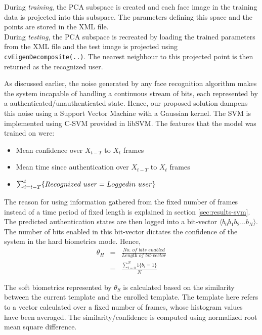 \documentclass[%
        final,
        notitlepage,
        narroweqnarray,
        inline,
        ]{ieee}
\begin{document}
During \emph{training}, the PCA subspace is created and each face image in the training data is projected into this subspace.
The parameters defining this space and the points are stored in the XML file.\\
During \emph{testing}, the PCA subspace is recreated by loading the trained parameters from the XML file and the test image is projected using \verb+cvEigenDecomposite(..)+.
The nearest neighbour to this projected point is then returned as the recognized user.

As discussed earlier, the noise generated by any face recognition algorithm makes the system incapable of handling a continuous stream of bits, each represented by a authenticated/unauthenticated state.
Hence, our proposed solution dampens this noise using a Support Vector Machine with a Gaussian kernel.
The SVM is implemented using C-SVM provided in libSVM\cite{libsvm}.
The features that the model was trained on were:
\begin{itemize}
	\item Mean confidence over $X_{t-T}$ to $X_{t}$ frames
	\item Mean time since authentication over $X_{t-T}$ to $X_{t}$ frames
	\item $\sum_{i=t-T}^{t}\{Recognized\ user = Logged\-in\ user\}$
\end{itemize}
The reason for using information gathered from the fixed number of frames instead of a time period of fixed length is explained in section \ref{sec:results-svm}.
The predicted authentication states are then logged into a bit-vector $\langle b_0 b_1 b_2 \ldots b_N \rangle$.
The number of bits enabled in this bit-vector dictates the confidence of the system in the hard biometrics mode.
Hence,
\begin{eqnarray}
\theta_{H} & = & \frac {\textit{No. of bits enabled}} {\textit{Length of bit-vector}}\\
           & = & \frac{\sum_{i=0}^{N} 1\{b_i=1\}}{N}
\end{eqnarray}

The soft biometrics represented by $\theta_{S}$ is calculated based on the similarity between the current template and the enrolled template.
The template here refers to a vector calculated over a fixed number of frames, whose histogram values have been averaged.
The similarity/confidence is computed using normalized root mean square difference.
 
\end{document}
